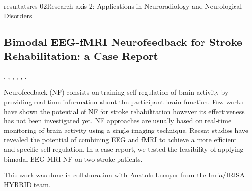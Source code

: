 \documentclass{ra2018}
\begin{document}
\begin{module}{resultats}{res-02}{Research axis 2: Applications in Neuroradiology and Neurological Disorders}

\subsection{Bimodal EEG-fMRI Neurofeedback for Stroke Rehabilitation: a Case Report}
\begin{participants}
      , 
      , 
      ,
      ,
      ,
      .
\end{participants}
Neurofeedback  (NF)  consists  on  training  self-regulation  of  brain  activity  by  providing  real-time information about the participant brain function.  Few works have shown the potential of NF for stroke rehabilitation however its effectiveness has not been investigated yet. NF approaches are usually based on real-time monitoring of brain activity using a single imaging technique.  Recent studies have revealed the potential of combining EEG and fMRI to achieve a more efficient and specific self-regulation. In a case report, we tested the feasibility of applying bimodal EEG-MRI NF on two stroke patients.~\cite{lioi:inserm-01932954}

This work was done in collaboration with Anatole Lecuyer from the Inria/IRISA HYBRID team.


\end{module}
\end{document}
